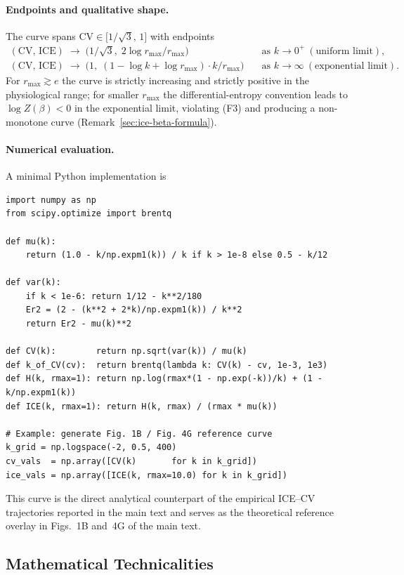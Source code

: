 \documentclass[11pt]{article}
\theoremstyle{remark}
\theoremstyle{definition}
\begin{document}
\paragraph{Endpoints and qualitative shape.}
The curve spans $\mathrm{CV}\in\bigl[1/\sqrt{3},\,1\bigr]$ with endpoints
\begin{align}
(\mathrm{CV},\,\mathrm{ICE}) \;\to\;
\bigl(1/\sqrt{3},\;2\log r_{\max}/r_{\max}\bigr) \quad &\text{as } k\to 0^{+}\ (\text{uniform limit}), \\
(\mathrm{CV},\,\mathrm{ICE}) \;\to\;
\bigl(1,\; (1-\log k + \log r_{\max})\cdot k/r_{\max}\bigr) \quad &\text{as } k\to\infty\ (\text{exponential limit}).
\end{align}
For $r_{\max}\gtrsim e$ the curve is strictly increasing and strictly positive in the physiological range; for smaller $r_{\max}$ the differential-entropy convention leads to $\log Z(\beta)<0$ in the exponential limit, violating (F3) and producing a non-monotone curve (Remark~\ref{sec:ice-beta-formula}).

\paragraph{Numerical evaluation.}
A minimal Python implementation is
\begin{verbatim}
import numpy as np
from scipy.optimize import brentq

def mu(k):
    return (1.0 - k/np.expm1(k)) / k if k > 1e-8 else 0.5 - k/12

def var(k):
    if k < 1e-6: return 1/12 - k**2/180
    Er2 = (2 - (k**2 + 2*k)/np.expm1(k)) / k**2
    return Er2 - mu(k)**2

def CV(k):        return np.sqrt(var(k)) / mu(k)
def k_of_CV(cv):  return brentq(lambda k: CV(k) - cv, 1e-3, 1e3)
def H(k, rmax=1): return np.log(rmax*(1 - np.exp(-k))/k) + (1 - k/np.expm1(k))
def ICE(k, rmax=1): return H(k, rmax) / (rmax * mu(k))

# Example: generate Fig. 1B / Fig. 4G reference curve
k_grid = np.logspace(-2, 0.5, 400)
cv_vals  = np.array([CV(k)       for k in k_grid])
ice_vals = np.array([ICE(k, rmax=10.0) for k in k_grid])
\end{verbatim}

This curve is the direct analytical counterpart of the empirical ICE--CV trajectories reported in the main text and serves as the theoretical reference overlay in Figs.~1B and~4G of the main text.

\subsection{Mathematical Technicalities}
\end{document}
